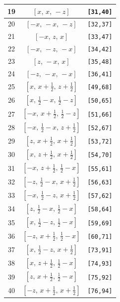 \documentclass[fleqn,8pt]{jsarticle}
\begin{document}
\begin{longtable}{ccc}
19 & $\left[ x,\, x,\, - z \right]$ & {\tt [31,40]} \\ \hline
20 & $\left[ - x,\, - x,\, - z \right]$ & {\tt [32,37]} \\ \hline
21 & $\left[ - x,\, z,\, x \right]$ & {\tt [33,47]} \\ \hline
22 & $\left[ - x,\, - z,\, - x \right]$ & {\tt [34,42]} \\ \hline
23 & $\left[ z,\, - x,\, x \right]$ & {\tt [35,48]} \\ \hline
24 & $\left[ - z,\, - x,\, - x \right]$ & {\tt [36,41]} \\ \hline
25 & $\left[ x,\, x + \frac{1}{2},\, z + \frac{1}{2} \right]$ & {\tt [49,68]} \\ \hline
26 & $\left[ x,\, \frac{1}{2} - x,\, \frac{1}{2} - z \right]$ & {\tt [50,65]} \\ \hline
27 & $\left[ - x,\, x + \frac{1}{2},\, \frac{1}{2} - z \right]$ & {\tt [51,66]} \\ \hline
28 & $\left[ - x,\, \frac{1}{2} - x,\, z + \frac{1}{2} \right]$ & {\tt [52,67]} \\ \hline
29 & $\left[ z,\, x + \frac{1}{2},\, x + \frac{1}{2} \right]$ & {\tt [53,72]} \\ \hline
30 & $\left[ x,\, z + \frac{1}{2},\, x + \frac{1}{2} \right]$ & {\tt [54,70]} \\ \hline
31 & $\left[ - x,\, z + \frac{1}{2},\, \frac{1}{2} - x \right]$ & {\tt [55,61]} \\ \hline
32 & $\left[ - z,\, \frac{1}{2} - x,\, x + \frac{1}{2} \right]$ & {\tt [56,63]} \\ \hline
33 & $\left[ - x,\, \frac{1}{2} - z,\, x + \frac{1}{2} \right]$ & {\tt [57,62]} \\ \hline
34 & $\left[ z,\, \frac{1}{2} - x,\, \frac{1}{2} - x \right]$ & {\tt [58,64]} \\ \hline
35 & $\left[ x,\, \frac{1}{2} - z,\, \frac{1}{2} - x \right]$ & {\tt [59,69]} \\ \hline
36 & $\left[ - z,\, x + \frac{1}{2},\, \frac{1}{2} - x \right]$ & {\tt [60,71]} \\ \hline
37 & $\left[ x,\, \frac{1}{2} - z,\, x + \frac{1}{2} \right]$ & {\tt [73,91]} \\ \hline
38 & $\left[ x,\, z + \frac{1}{2},\, \frac{1}{2} - x \right]$ & {\tt [74,93]} \\ \hline
39 & $\left[ z,\, x + \frac{1}{2},\, \frac{1}{2} - x \right]$ & {\tt [75,92]} \\ \hline
40 & $\left[ - z,\, x + \frac{1}{2},\, x + \frac{1}{2} \right]$ & {\tt [76,94]} \\ \hline

\end{longtable}
\end{document}
